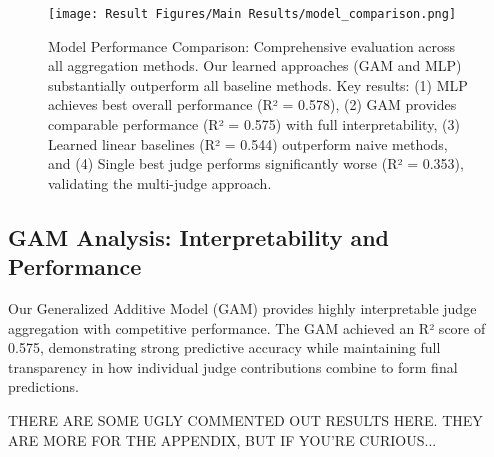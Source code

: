 \begin{figure}[htbp]
    \centering
    \texttt{[image: Result Figures/Main Results/model\_comparison.png]}
    \caption{Model Performance Comparison: Comprehensive evaluation across all aggregation methods. Our learned approaches (GAM and MLP) substantially outperform all baseline methods. Key results: (1) MLP achieves best overall performance (R² = 0.578), (2) GAM provides comparable performance (R² = 0.575) with full interpretability, (3) Learned linear baselines (R² = 0.544) outperform naive methods, and (4) Single best judge performs significantly worse (R² = 0.353), validating the multi-judge approach.}
    \label{fig:model_comparison}
\end{figure}

\subsection{GAM Analysis: Interpretability and Performance}

Our Generalized Additive Model (GAM) provides highly interpretable judge aggregation with competitive performance. The GAM achieved an R² score of 0.575, demonstrating strong predictive accuracy while maintaining full transparency in how individual judge contributions combine to form final predictions.

THERE ARE SOME UGLY COMMENTED OUT RESULTS HERE. THEY ARE MORE FOR THE APPENDIX, BUT IF YOU'RE CURIOUS...



